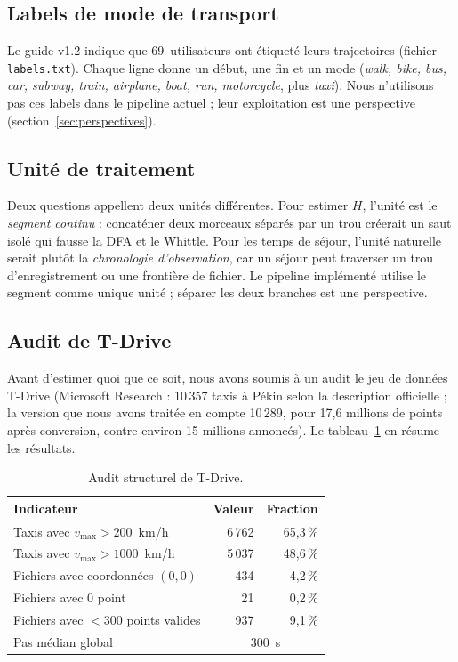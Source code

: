 \documentclass[11pt,a4paper]{article}
\newcommand{\code}[1]{\texttt{#1}}
\renewcommand{\_}{\textunderscore\penalty0\hspace{0pt}}
\begin{document}
\subsection{Labels de mode de transport}

Le guide v1.2 indique que 69~utilisateurs ont étiqueté leurs trajectoires (fichier
\code{labels.txt}). Chaque ligne donne un début, une fin et un mode (\emph{walk, bike, bus,
car, subway, train, airplane, boat, run, motorcycle}, plus \emph{taxi}). Nous n'utilisons
pas ces labels dans le pipeline actuel ; leur exploitation est une perspective
(section~\ref{sec:perspectives}).

\subsection{Unité de traitement}
\label{sec:unite}

Deux questions appellent deux unités différentes. Pour estimer $H$, l'unité est le
\emph{segment continu} : concaténer deux morceaux séparés par un trou créerait un saut
isolé qui fausse la DFA et le Whittle. Pour les temps de séjour, l'unité naturelle serait
plutôt la \emph{chronologie d'observation}, car un séjour peut traverser un trou
d'enregistrement ou une frontière de fichier. Le pipeline implémenté utilise le segment
comme unique unité ; séparer les deux branches est une perspective.

\subsection{Audit de T-Drive}
\label{sec:tdrive}

Avant d'estimer quoi que ce soit, nous avons soumis à un audit le jeu de données T-Drive
(Microsoft Research : 10\,357 taxis à Pékin selon la description officielle ; la version
que nous avons traitée en compte 10\,289, pour 17,6 millions de points après conversion,
contre environ 15 millions annoncés). Le tableau~\ref{tab:tdrive} en résume les résultats.

\begin{table}[ht]
\centering
\caption{Audit structurel de T-Drive.}
\label{tab:tdrive}
\small
\begin{tabular}{lrr}
\toprule
Indicateur & Valeur & Fraction \\
\midrule
Taxis avec $v_{\max} > 200$~km/h & 6\,762 & 65{,}3\,\% \\
Taxis avec $v_{\max} > 1000$~km/h & 5\,037 & 48{,}6\,\% \\
Fichiers avec coordonnées $(0,0)$ & 434 & 4{,}2\,\% \\
Fichiers avec 0 point & 21 & 0{,}2\,\% \\
Fichiers avec $<300$ points valides & 937 & 9{,}1\,\% \\
Pas médian global & \multicolumn{2}{c}{300~s} \\
\bottomrule
\end{tabular}
\end{table}
\end{document}

